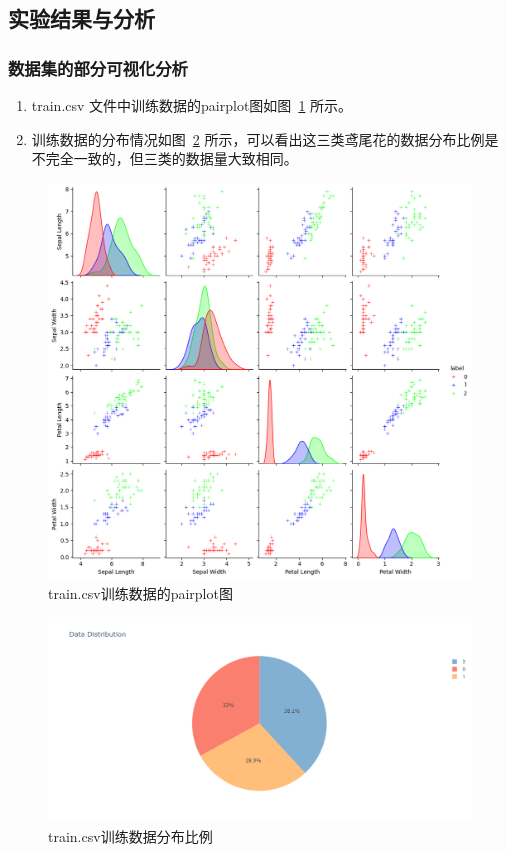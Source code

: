 \documentclass[12pt]{article}
\begin{document}
\subsection{实验结果与分析}
\subsubsection{数据集的部分可视化分析}
\begin{enumerate}
  \item train.csv 文件中训练数据的pairplot图如图~\ref{fig:pairplot} 所示。
  \item 训练数据的分布情况如图~\ref{fig:pie} 所示，可以看出这三类鸢尾花的数据分布比例是不完全一致的，但三类的数据量大致相同。
\end{enumerate}

\begin{figure}[htbp]
  \centering
  \includegraphics[scale=0.45]{figures/knn/pairplot.png}
  \caption{train.csv训练数据的pairplot图}
  \label{fig:pairplot}
\end{figure}

\begin{figure}[htbp]
  \centering
  \includegraphics[scale=0.4]{figures/knn/distribution.png}
  \caption{train.csv训练数据分布比例}
  \label{fig:pie}
\end{figure}
\end{document}
